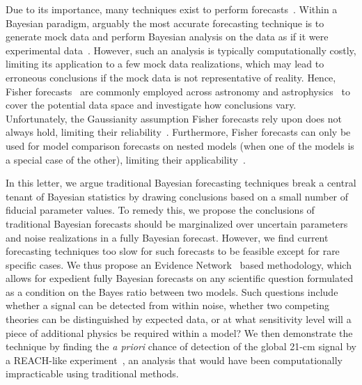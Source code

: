 \documentclass[twocolumn,english,aps,prl,amsmath,amssymb,reprint,footinbib,floatfix,showkeys]{revtex4-2}
\begin{document}
Due to its importance, many techniques exist to perform forecasts~\citep[e.g.][]{Fisher_1922, Trotta_2007b, Sellentin_2014, Ryan_2023}. 
Within a Bayesian paradigm, arguably the most accurate forecasting technique is to generate mock data and perform Bayesian analysis on the data as if it were experimental data~\citep[e.g.][]{Anstey_2021, Rieck_2023}.
However, such an analysis is typically computationally costly, limiting its application to a few mock data realizations, which may lead to erroneous conclusions if the mock data is not representative of reality.
Hence, Fisher forecasts~\citep{Fisher_1922} are commonly employed across astronomy and astrophysics~\citep{Tegmark_1997, DETF, Trotta_2007b, 2007_Seo, Vallisneri_2008, More_2013, DiDio_2014, Zhai_2017, Bonvin_2018, Simons, Euclid_2020, dAssignies_2023, Mason_2023} to cover the potential data space and investigate how conclusions vary.
Unfortunately, the Gaussianity assumption Fisher forecasts rely upon does not always hold, limiting their reliability~\citep[e.g.][]{Perotto_2006, Wolz_2012}.
Furthermore, Fisher forecasts can only be used for model comparison forecasts on nested models (when one of the models is a special case of the other), limiting their applicability~\citep{Trotta_2007}. 


In this letter, we argue traditional Bayesian forecasting techniques break a central tenant of Bayesian statistics by drawing conclusions based on a small number of fiducial parameter values. 
To remedy this, we propose the conclusions of traditional Bayesian forecasts should be marginalized over uncertain parameters and noise realizations in a fully Bayesian forecast. 
However, we find current forecasting techniques too slow for such forecasts to be feasible except for rare specific cases.
We thus propose an Evidence Network~\citep{EN} based methodology, which allows for expedient fully Bayesian forecasts on any scientific question formulated as a condition on the Bayes ratio between two models.
Such questions include whether a signal can be detected from within noise, whether two competing theories can be distinguished by expected data, or at what sensitivity level will a piece of additional physics be required within a model?
We then demonstrate the technique by finding the \textit{a priori} chance of detection of the global 21-cm signal by a REACH-like experiment~\citep{REACH}, an analysis that would have been computationally impracticable using traditional methods.
\end{document}
